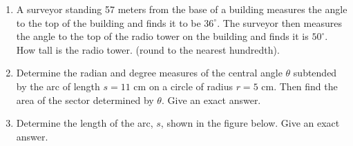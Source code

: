 \begin{enumerate}
\item A surveyor standing 57 meters from the base of a building
  measures the angle to the top of the building and finds it to be
  $36^\circ$.  The surveyor then measures the angle to the top of the
  radio tower on the building and finds it is $50^\circ$.  How tall is
  the radio tower.  (round to the nearest hundredth).\vfill

\item Determine the radian and degree measures of the central angle
  $\theta$ subtended by the arc of length $s=11$ cm on a circle of
  radius $r=5$ cm.  Then find the area of the sector determined by
  $\theta.$ Give an exact answer.\vfill

\item Determine the length of the arc, $s$, shown in the figure below.
  Give an exact answer.



\end{enumerate}

